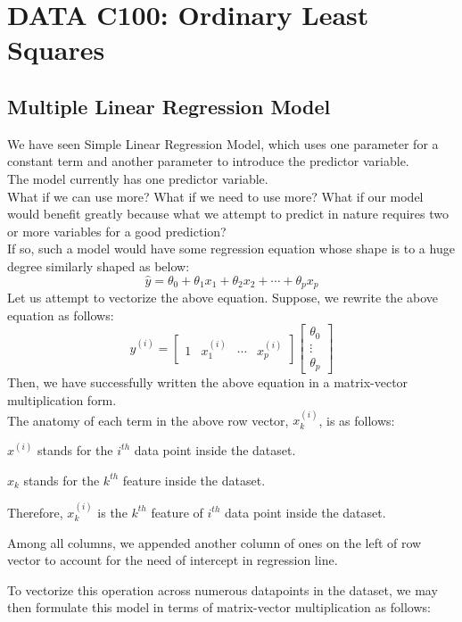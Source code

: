 \chapter{DATA C100: Ordinary Least Squares}

\section{Multiple Linear Regression Model}
We have seen Simple Linear Regression Model, which uses one parameter for a constant term and another parameter to introduce the predictor variable. \\
The model currently has one predictor variable. \\
What if we can use more? What if we need to use more? What if our model would benefit greatly because what we attempt to predict in nature requires two or more variables for a good prediction? \\
If so, such a model would have some regression equation whose shape is to a huge degree similarly shaped as below:
\[\hat{y} = \theta_0 + \theta_1 x_1 + \theta_2 x_2 + \cdots + \theta_p x_p\]
Let us attempt to vectorize the above equation. Suppose, we rewrite the above equation as follows:
\[
    \hat{y}^{(i)} = 
    \begin{bmatrix} 1 & x_1^{(i)} & \cdots & x_p^{(i)} \end{bmatrix}
    \begin{bmatrix} \theta_0 \\ \vdots \\ \theta_p \end{bmatrix}
\]
Then, we have successfully written the above equation in a matrix-vector multiplication form. \\
The anatomy of each term in the above row vector, $x_k^{(i)}$, is as follows:
\begin{bindenum}
    \item $x^{(i)}$ stands for the $i^{th}$ data point inside the dataset.
    \item $x_k$ stands for the $k^{th}$ feature inside the dataset.
    \item Therefore, $x_k^{(i)}$ is the $k^{th}$ feature of $i^{th}$ data point inside the dataset.
    \item Among all columns, we appended another column of ones on the left of row vector to account for the need of intercept in regression line.
\end{bindenum}
To vectorize this operation across numerous datapoints in the dataset, we may then formulate this model in terms of matrix-vector multiplication as follows:
